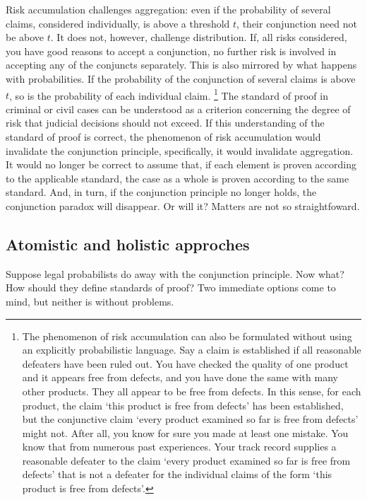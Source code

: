 \documentclass[
  10pt,
  dvipsnames,enabledeprecatedfontcommands]{scrartcl}
\begin{document}
Risk accumulation challenges aggregation: even if the probability of
several claims, considered individually, is above a threshold \(t\),
their conjunction need not be above \(t\). It does not, however,
challenge distribution. If, all risks considered, you have good reasons
to accept a conjunction, no further risk is involved in accepting any of
the conjuncts separately. This is also mirrored by what happens with
probabilities. If the probability of the conjunction of several claims
is above \(t\), so is the probability of each individual claim.
\footnote{The phenomenon of risk accumulation can also be formulated
  without using an explicitly probabilistic language. Say a claim is
  established if all reasonable defeaters have been ruled out. You have
  checked the quality of one product and it appears free from defects,
  and you have done the same with many other products. They all appear
  to be free from defects. In this sense, for each product, the claim
  `this product is free from defects' has been established, but the
  conjunctive claim `every product examined so far is free from defects'
  might not. After all, you know for sure you made at least one mistake.
  You know that from numerous past experiences. Your track record
  supplies a reasonable defeater to the claim `every product examined so
  far is free from defects' that is not a defeater for the individual
  claims of the form `this product is free from defects'.} The standard
of proof in criminal or civil cases can be understood as a criterion
concerning the degree of risk that judicial decisions should not exceed.
If this understanding of the standard of proof is correct, the
phenomenon of risk accumulation would invalidate the conjunction
principle, specifically, it would invalidate aggregation. It would no
longer be correct to assume that, if each element is proven according to
the applicable standard, the case as a whole is proven according to the
same standard. And, in turn, if the conjunction principle no longer
holds, the conjunction paradox will disappear. Or will it? Matters are
not so straightfoward.

\hypertarget{atomistic-and-holistic-approches}{%
\subsection{Atomistic and holistic
approches}\label{atomistic-and-holistic-approches}}

Suppose legal probabilists do away with the conjunction principle. Now
what? How should they define standards of proof? Two immediate options
come to mind, but neither is without problems.
\end{document}
